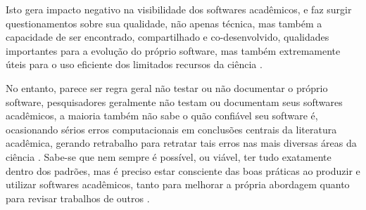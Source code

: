 %
%
%

Isto gera impacto negativo na visibilidade dos softwares acadêmicos, e faz
surgir questionamentos sobre sua qualidade, não apenas técnica, mas também a
capacidade de ser encontrado, compartilhado e co-desenvolvido, qualidades
importantes para a evolução do próprio software, mas também extremamente úteis
para o uso eficiente dos limitados recursos da ciência \cite{howison2013,
katz2014transitive}.

%

No entanto, parece ser regra geral não testar ou não documentar o próprio software,
pesquisadores geralmente não testam ou documentam seus softwares acadêmicos, a
maioria também não sabe o quão confiável seu software é, ocasionando sérios
erros computacionais em conclusões centrais da literatura acadêmica, gerando
retrabalho para retratar tais erros nas mais diversas áreas da ciência
\cite{Merali2010Computational}. Sabe-se que nem sempre é possível, ou viável,
ter tudo exatamente dentro dos padrões, mas é preciso estar consciente das boas
práticas ao produzir e utilizar softwares acadêmicos, tanto para melhorar a
própria abordagem quanto para revisar trabalhos de outros
\cite{wilson2014best}.

